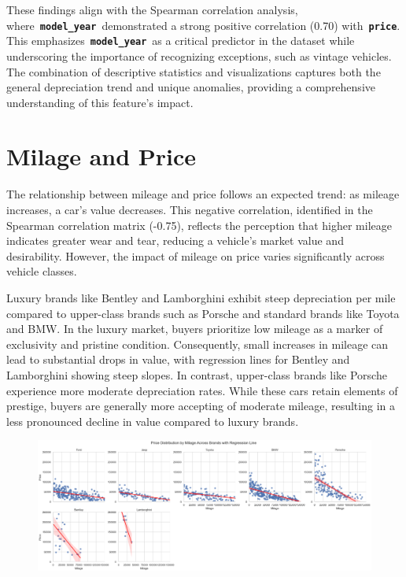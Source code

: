 \documentclass[a4paper,oneside,bibliography=totoc]{scrbook}
\begin{document}
These findings align with the Spearman correlation analysis, where~\textbf{\texttt{model\_year}}~demonstrated a strong positive correlation (0.70) with~\textbf{\texttt{price}}. This emphasizes~\textbf{\texttt{model\_year}}~as a critical predictor in the dataset while underscoring the importance of recognizing exceptions, such as vintage vehicles. The combination of descriptive statistics and visualizations captures both the general depreciation trend and unique anomalies, providing a comprehensive understanding of this feature's impact.

\section{Milage and Price}
\label{sec:milageAndPrice}

The relationship between mileage and price follows an expected trend: as mileage increases, a car's value decreases. This negative correlation, identified in the Spearman correlation matrix (-0.75), reflects the perception that higher mileage indicates greater wear and tear, reducing a vehicle's market value and desirability. However, the impact of mileage on price varies significantly across vehicle classes.

Luxury brands like Bentley and Lamborghini exhibit steep depreciation per mile compared to upper-class brands such as Porsche and standard brands like Toyota and BMW. In the luxury market, buyers prioritize low mileage as a marker of exclusivity and pristine condition. Consequently, small increases in mileage can lead to substantial drops in value, with regression lines for Bentley and Lamborghini showing steep slopes. In contrast, upper-class brands like Porsche experience more moderate depreciation rates. While these cars retain elements of prestige, buyers are generally more accepting of moderate mileage, resulting in a less pronounced decline in value compared to luxury brands.

\begin{figure}[h]
	\includegraphics[width=\linewidth]{images/milage_price.png}
	\centering
\end{figure}
\end{document}
